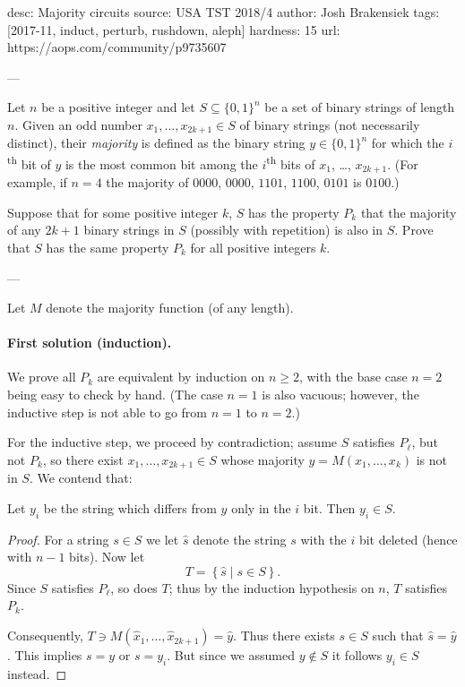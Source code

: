 desc: Majority circuits
source: USA TST 2018/4
author: Josh Brakensiek
tags: [2017-11, induct, perturb, rushdown, aleph]
hardness: 15
url: https://aops.com/community/p9735607

---

Let $n$ be a positive integer and let $S \subseteq \{0,1\}^n$
be a set of binary strings of length $n$.
Given an odd number $x_1, \dots, x_{2k+1} \in S$ of binary strings
(not necessarily distinct), their \emph{majority} is defined as
the binary string $y \in \{0,1\}^n$ for which
the $i$\textsuperscript{th} bit of $y$ is the most common bit
among the $i$\textsuperscript{th} bits of $x_1$, \dots, $x_{2k+1}$.
(For example, if $n=4$ the majority of
$0000$, $0000$, $1101$, $1100$, $0101$ is $0100$.)

Suppose that for some positive integer $k$,
$S$ has the property $P_k$ that the majority of any $2k+1$
binary strings in $S$ (possibly with repetition) is also in $S$.
Prove that $S$ has the same property $P_k$ for all
positive integers $k$.

---

Let $M$ denote the majority function (of any length).

\paragraph{First solution (induction).}
We prove all $P_k$ are equivalent by induction on $n \ge 2$,
with the base case $n = 2$ being easy to check by hand.
(The case $n=1$ is also vacuous; however,
the inductive step is not able to go from $n=1$ to $n=2$.)

For the inductive step, we proceed by contradiction;
assume $S$ satisfies $P_{\ell}$, but not $P_{k}$,
so there exist $x_1, \dots, x_{2k+1} \in S$
whose majority $y = M(x_1, \dots, x_k)$ is not in $S$.
We contend that:
\begin{claim*}
  Let $y_i$ be the string which differs from $y$
  only in the $i$ bit.
  Then $y_i \in S$.
\end{claim*}
\begin{proof}
  For a string $s \in S$
  we let $\hat s$ denote the string $s$ with the $i$ bit deleted
  (hence with $n-1$ bits).
  Now let \[ T = \left\{ \hat s \mid s \in S \right\}. \]
  Since $S$ satisfies $P_\ell$, so does $T$;
  thus by the induction hypothesis on $n$, $T$ satisfies $P_{k}$.

  Consequently, $T \ni M(\hat{x}_1, \dots, \hat{x}_{2k+1}) = \hat y$.
  Thus there exists $s \in S$ such that $\hat s = \hat y$.
  This implies $s = y$ or $s = y_i$.
  But since we assumed $y \notin S$ it follows $y_i \in S$ instead.
\end{proof}

